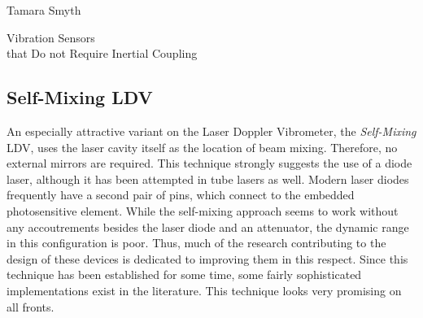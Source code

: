 \documentclass[a4paper,10pt]{report}
\numberwithin{equation}{section}
\begin{document}
\begin{chapter}{Tamara Smyth}
\begin{section}{Vibration Sensors \\that Do not Require Inertial Coupling}
 \subsection{Self-Mixing LDV}
 An especially attractive variant on the Laser Doppler Vibrometer, the \emph{Self-Mixing} LDV, uses the laser cavity itself as the location of beam mixing. Therefore, no external mirrors are required. This technique strongly suggests the use of a diode laser, although it has been attempted in tube lasers as well.\cite{Giuliani2003} Modern laser diodes frequently have a second pair of pins, which connect to the embedded photosensitive element. 
While the self-mixing approach seems to work without any accoutrements besides the laser diode and an attenuator, the dynamic range in this configuration is poor. Thus, much of the research contributing to the design of these devices is dedicated to improving them in this respect. 
Since this technique has been established for some time, some fairly sophisticated implementations exist in the literature. This technique looks very promising on all fronts. 
\end{section}

\end{chapter}
\end{document}
